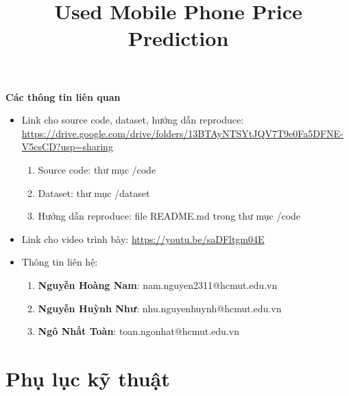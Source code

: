 \documentclass[twoside]{hcmut-report}
\title{Used Mobile Phone Price Prediction}
\begin{document}
\hypersetup{pageanchor=false}
\coverpage

\setcounter{page}{1}
\renewcommand{\contentsname}{Mục lục}
\renewcommand{\figurename}{Hình}
\tableofcontents
\clearpage

\thispagestyle{plain}
\begin{center}
\Large\textbf{Các thông tin liên quan}
\end{center}
\vspace{1em}
\begin{itemize}[leftmargin=*]
  \item Link cho source code, dataset, hướng dẫn reproduce: \url{https://drive.google.com/drive/folders/13BTAyNTSYtJQV7T9e0Fa5DFNE-V5csCD?usp=sharing}
  \begin{enumerate}
    \item Source code: thư mục /code
    \item Dataset: thư mục /dataset
    \item Hướng dẫn reproduce: file README.md trong thư mục /code
  \end{enumerate}
  \item Link cho video trình bày: \url{https://youtu.be/saDFltgm04E}
  \item Thông tin liên hệ:
  \begin{enumerate}
    \item \textbf{Nguyễn Hoàng Nam}: nam.nguyen2311@hcmut.edu.vn
    \item \textbf{Nguyễn Huỳnh Như}: nhu.nguyenhuynh@hcmut.edu.vn
    \item \textbf{Ngô Nhất Toàn}: toan.ngonhat@hcmut.edu.vn
  \end{enumerate}
\end{itemize}
\clearpage
\hypersetup{pageanchor=true}

\setcounter{page}{1}







\newpage
\nocite{*}
 
       

\clearpage
\appendix
{}
\section*{Phụ lục kỹ thuật}





\end{document}
